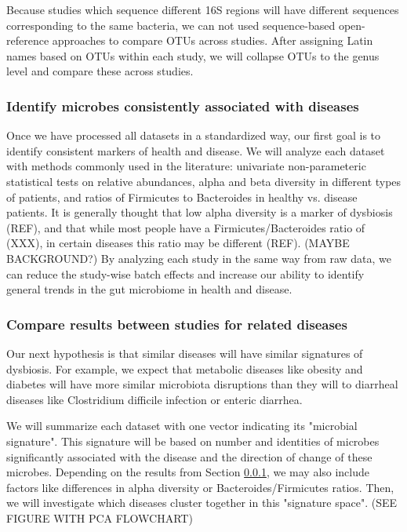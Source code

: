 \documentclass[12pt]{article}
\begin{document}
Because studies which sequence different 16S regions will have different sequences corresponding to the same bacteria, we can not used sequence-based open-reference approaches to compare OTUs across studies. After assigning Latin names based on OTUs within each study, we will collapse OTUs to the genus level and compare these across studies.

\subsubsection{Identify microbes consistently associated with diseases}\label{sec:indep_studies}
Once we have processed all datasets in a standardized way, our first goal is to identify consistent markers of health and disease. We will analyze each dataset with methods commonly used in the literature: univariate non-parameteric statistical tests on relative abundances, alpha and beta diversity in different types of patients, and ratios of Firmicutes to Bacteroides in healthy vs. disease patients. It is generally thought that low alpha diversity is a marker of dysbiosis (REF), and that while most people have a Firmicutes/Bacteroides ratio of (XXX), in certain diseases this ratio may be different (REF). (MAYBE BACKGROUND?) By analyzing each study in the same way from raw data, we can reduce the study-wise batch effects and increase our ability to identify general trends in the gut microbiome in health and disease.  

\subsubsection{Compare results between studies for related diseases}
Our next hypothesis is that similar diseases will have similar signatures of dysbiosis. For example, we expect that metabolic diseases like obesity and diabetes will have more similar microbiota disruptions than they will to diarrheal diseases like Clostridium difficile infection or enteric diarrhea. 

We will summarize each dataset with one vector indicating its "microbial signature". This signature will be based on number and identities of microbes significantly associated with the disease and the direction of change of these microbes. Depending on the results from Section \ref{sec:indep_studies}, we may also include factors like differences in alpha diversity or Bacteroides/Firmicutes ratios. Then, we will investigate which diseases cluster together in this "signature space". (SEE FIGURE WITH PCA FLOWCHART) 
\end{document}
